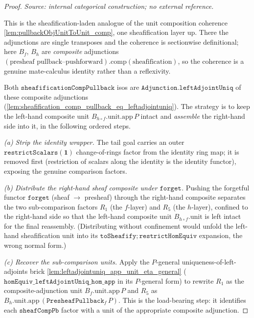 \begin{proof}
  \leanok
  \textit{Source: internal categorical construction; no external reference.}

  This is the sheafification-laden analogue of the unit composition coherence
  \cref{lem:pullbackObjUnitToUnit_comp}, one sheafification layer up. There the adjunctions
  are single transposes and the coherence is sectionwise definitional; here \(B_f\), \(B_h\)
  are \emph{composite} adjunctions \((\text{presheaf pullback--pushforward})\mathbin{.\mathrm{comp}}
  (\text{sheafification})\), so the coherence is a genuine mate-calculus identity rather than a
  reflexivity.

  Both \(\mathtt{sheafificationCompPullback}\) isos are
  \(\mathtt{Adjunction.leftAdjointUniq}\) of these composite adjunctions
  (\cref{lem:sheafification_comp_pullback_eq_leftadjointuniq}). The strategy is to keep the
  left-hand composite unit \(B_{h \circ f}.\mathrm{unit}.\mathrm{app}\,P\) intact and
  \emph{assemble} the right-hand side into it, in the following ordered steps.

  \emph{(a) Strip the identity wrapper.} The tail goal carries an outer
  \(\mathtt{restrictScalars}(\mathbf{1})\) change-of-rings factor from the identity ring map;
  it is removed first (restriction of scalars along the identity is the identity functor),
  exposing the genuine comparison factors.

  \emph{(b) Distribute the right-hand sheaf composite under \(\mathtt{forget}\).} Pushing the
  forgetful functor \(\mathtt{forget}\) (sheaf \(\to\) presheaf) through the right-hand
  composite separates the two sub-comparison factors \(R_1\) (the \(f\)-layer) and \(R_5\)
  (the \(h\)-layer), confined to the right-hand side so that the left-hand composite unit
  \(B_{h \circ f}.\mathrm{unit}\) is left intact for the final reassembly. (Distributing
  without confinement would unfold the left-hand sheafification unit into its
  \(\mathtt{toSheafify} \mathbin{;} \mathtt{restrictHomEquiv}\) expansion, the wrong normal
  form.)

  \emph{(c) Recover the sub-comparison units.} Apply the \(P\)-general
  uniqueness-of-left-adjoints brick \cref{lem:leftadjointuniq_app_unit_eta_general}
  (\(\mathtt{homEquiv\_leftAdjointUniq\_hom\_app}\) in its \(P\)-general form) to rewrite
  \(R_1\) as the composite-adjunction unit \(B_f.\mathrm{unit}.\mathrm{app}\,P\) and \(R_5\)
  as \(B_h.\mathrm{unit}.\mathrm{app}\,(\mathtt{PresheafPullback}_f\,P)\). This is the
  load-bearing step: it identifies each \(\mathtt{sheafCompPb}\) factor with a unit of the
  appropriate composite adjunction.


\end{proof}
